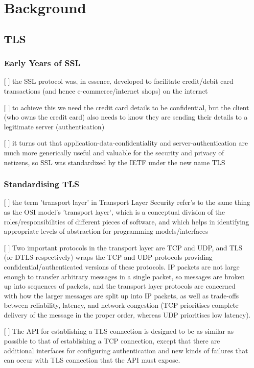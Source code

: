 \chapter{Background}

\section{TLS}
\subsection{Early Years of SSL}
[ ] the SSL protocol was, in essence, developed to facilitate credit/debit card transactions (and hence e-commerce/internet shops) on the internet

[ ] to achieve this we need the credit card details to be confidential, but the client (who owns the credit card) also needs to know they are sending their details to a legitimate server (authentication) 

[ ] it turns out that application-data-confidentiality and server-authentication are much more generically useful and valuable for the security and privacy of netizens, so SSL was standardized by the IETF under the new name TLS

\subsection{Standardising TLS}

[ ] the term 'transport layer' in Transport Layer Security refer's to the same thing as the OSI model's 'transport layer', which is a conceptual division of the roles/responsibilities of different pieces of software, and which helps in identifying appropriate levels of abstraction for programming models/interfaces

[ ] Two important protocols in the transport layer are TCP and UDP, and TLS (or DTLS respectively) wraps the TCP and UDP protocols providing confidential/authenticated versions of these protocols. IP packets are not large enough to transfer arbitrary messages in a single packet, so messages are broken up into sequences of packets, and the transport layer protocols are concerned with how the larger messages are split up into IP packets, as well as trade-offs between reliability, latency, and network congestion (TCP prioritises complete delivery of the message in the proper order, whereas UDP prioritises low latency).

[ ] The API for establishing a TLS connection is designed to be as similar as possible to that of establishing a TCP connection, except that there are additional interfaces for configuring authentication and new kinds of failures that can occur with TLS connection that the API must expose.

